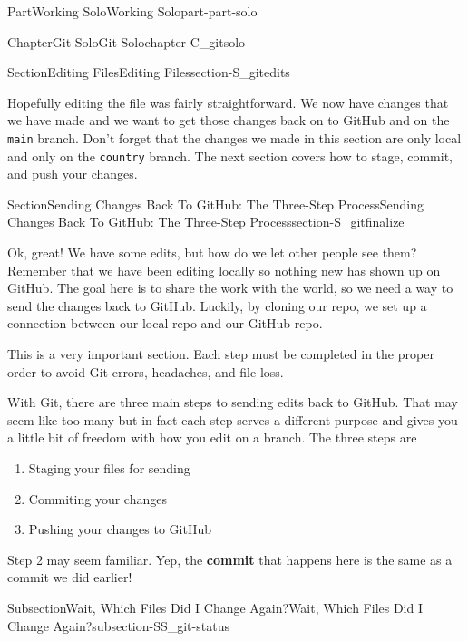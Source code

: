 \documentclass[oneside,10pt,]{book}
\newcommand{\mono}[1]{\texttt{#1}}
\newcommand{\terminology}[1]{\textbf{#1}}
\begin{document}
\begin{partptx}{Part}{Working Solo}{}{Working Solo}{}{}{part-part-solo}
\begin{chapterptx}{Chapter}{Git Solo}{}{Git Solo}{}{}{chapter-C_gitsolo}
\begin{sectionptx}{Section}{Editing Files}{}{Editing Files}{}{}{section-S_gitedits}
\par
Hopefully editing the file was fairly straightforward. We now have changes that we have made and we want to get those changes back on to GitHub and on the \mono{main} branch. Don't forget that the changes we made in this section are only local and only on the \mono{country} branch. The next section covers how to stage, commit, and push your changes.%
\end{sectionptx}
%
%
\typeout{************************************************}
\typeout{************************************************}
%
\begin{sectionptx}{Section}{Sending Changes Back To GitHub: The Three-Step Process}{}{Sending Changes Back To GitHub: The Three-Step Process}{}{}{section-S_gitfinalize}
%
%
\begin{introduction}{}%
Ok, great! We have some edits, but how do we let other people see them? Remember that we have been editing locally so nothing new has shown up on GitHub. The goal here is to share the work with the world, so we need a way to send the changes back to GitHub. Luckily, by cloning our repo, we set up a connection between our local repo and our GitHub repo.%
\par
This is a very important section. Each step must be completed in the proper order to avoid Git errors, headaches, and file loss.%
\par
With Git, there are three main steps to sending edits back to GitHub. That may seem like too many but in fact each step serves a different purpose and gives you a little bit of freedom with how you edit on a branch. The three steps are%
\begin{enumerate}
\item{}Staging your files for sending%
\item{}Commiting your changes%
\item{}Pushing your changes to GitHub%
\end{enumerate}
Step 2 may seem familiar. Yep, the \terminology{commit} that happens here is the same as a commit we did earlier!%
\end{introduction}%
%
%
\typeout{************************************************}
\typeout{************************************************}
%
\begin{subsectionptx}{Subsection}{Wait, Which Files Did I Change Again?}{}{Wait, Which Files Did I Change Again?}{}{}{subsection-SS_git-status}

\end{subsectionptx}
\end{sectionptx}
\end{chapterptx}
\end{partptx}
\end{document}
